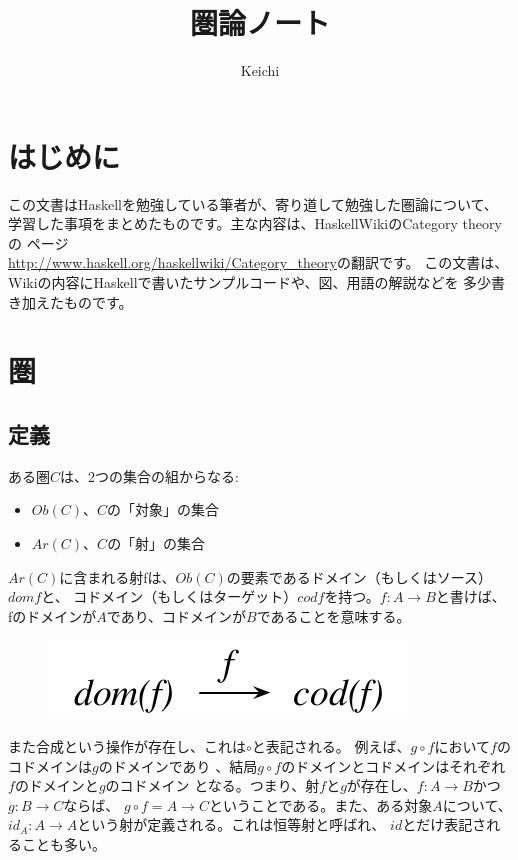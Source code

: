 \documentclass{jsarticle}
\begin{document}
\title{圏論ノート}
\author{Keichi}
\maketitle

\section{はじめに}
この文書はHaskellを勉強している筆者が、寄り道して勉強した圏論について、
学習した事項をまとめたものです。主な内容は、HaskellWikiのCategory theoryの
ページ\\\url{http://www.haskell.org/haskellwiki/Category_theory}の翻訳です。
この文書は、Wikiの内容にHaskellで書いたサンプルコードや、図、用語の解説などを
多少書き加えたものです。

\section{圏}

\subsection{定義}
ある圏$C$は、2つの集合の組からなる:

\begin{itemize}
    \item $Ob(C)$、$C$の「対象」の集合
    \item $Ar(C)$、$C$の「射」の集合
\end{itemize}

$Ar(C)$に含まれる射fは、$Ob(C)$の要素であるドメイン（もしくはソース）$dom f$と、
コドメイン（もしくはターゲット）$cod f$を持つ。$f:A \to B$と書けば、
fのドメインが$A$であり、コドメインが$B$であることを意味する。

\begin{figure}[htbp]
    \centering
    \includegraphics{diag_dom.pdf} 
\end{figure}

また合成という操作が存在し、これは$\circ$と表記される。
例えば、$g \circ f$において$f$のコドメインは$g$のドメインであり
、結局$g \circ f$のドメインとコドメインはそれぞれ$f$のドメインと$g$のコドメイン
となる。つまり、射$f$と$g$が存在し、$f:A \to B$かつ$g:B \to C$ならば、
$g \circ f = A \to C$ということである。また、ある対象$A$について、
$id_A: A \to A$という射が定義される。これは恒等射と呼ばれ、
$id$とだけ表記されることも多い。
\end{document}
